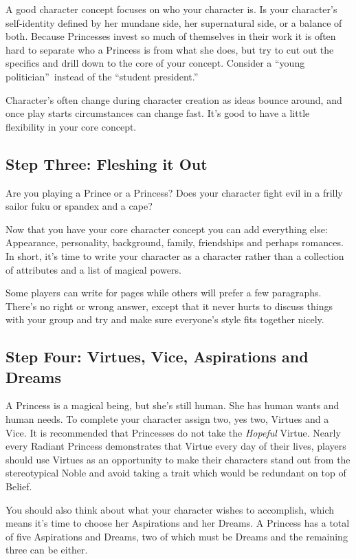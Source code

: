 A good character concept focuses on who your character is. Is your character's self-identity defined by her mundane side, her supernatural side, or a balance of both. Because Princesses invest so much of themselves in their work it is often hard to separate who a Princess is from what she does, but try to cut out the specifics and drill down to the core of your concept. Consider a \textquotedblleft young politician\textquotedblright\, instead of the \textquotedblleft student president.\textquotedblright  

Character's often change during character creation as ideas bounce around, and once play starts circumstances can change fast. It's good to have a little flexibility in your core concept. 

\subsection*{Step Three: Fleshing it Out}

Are you playing a Prince or a Princess? Does your character fight evil in a frilly sailor fuku or spandex and a cape? 

Now that you have your core character concept you can add everything else: Appearance, personality, background, family, friendships and perhaps romances. In short, it's time to write your character as a character rather than a collection of attributes and a list of magical powers. 

Some players can write for pages while others will prefer a few paragraphs. There's no right or wrong answer, except that it never hurts to discuss things with your group and try and make sure everyone's style fits together nicely.  

\subsection*{Step Four: Virtues, Vice, Aspirations and Dreams}   

A Princess is a magical being, but she's still human. She has human wants and human needs. To complete your character assign two, yes two, Virtues and a Vice. It is recommended that Princesses do not take the \textit{Hopeful} Virtue. Nearly every Radiant Princess demonstrates that Virtue every day of their lives, players should use Virtues as an opportunity to make their characters stand out from the stereotypical Noble and avoid taking a trait which would be redundant on top of Belief.  

You should also think about what your character wishes to accomplish, which means it's time to choose her Aspirations and her Dreams. A Princess has a total of five Aspirations and Dreams, two of which must be Dreams and the remaining three can be either. 

